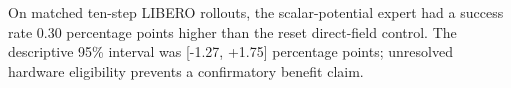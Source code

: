 On matched ten-step LIBERO rollouts, the scalar-potential expert had a success rate 0.30 percentage points higher than the reset direct-field control. The descriptive 95\% interval was [-1.27, +1.75] percentage points; unresolved hardware eligibility prevents a confirmatory benefit claim.
